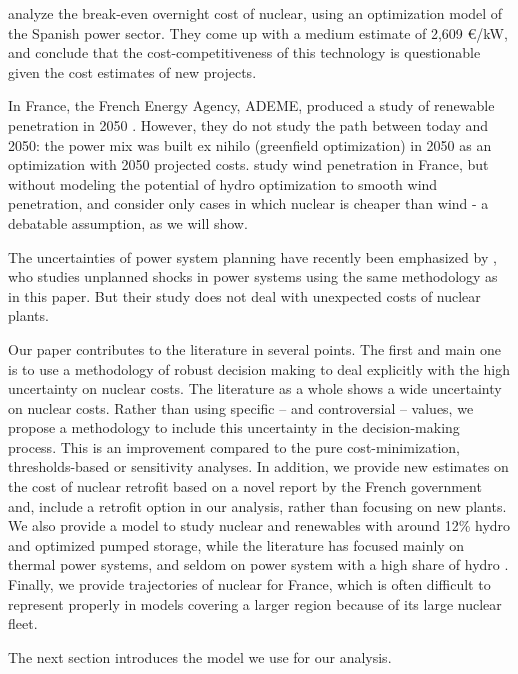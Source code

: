 \citet{Linares2013} analyze the break-even overnight cost of nuclear, using an optimization model of the Spanish power sector. They come up with a medium estimate of 2,609 \euro/kW, and conclude that the cost-competitiveness of this technology is questionable given the cost estimates of new projects.

In France, the French Energy Agency, ADEME, produced a study of renewable penetration in 2050 \citep{ADEME2015}. However, they do not study the path between today and 2050: the power mix was built ex nihilo (greenfield optimization) in 2050 as an optimization with 2050 projected costs.
\citet{Petitet2016} study wind penetration in France, but without modeling the potential of hydro optimization to smooth wind penetration, and consider only cases in which nuclear is cheaper than wind - a debatable assumption, as we will show.

The uncertainties of power system planning have recently been emphasized by \citet{Nahmmacher2016}, who studies unplanned shocks in power systems using the same methodology as in this paper. But their study does not deal with unexpected costs of nuclear plants.

Our paper contributes to the literature in several points. The first and main one is to use a methodology of robust decision making to deal explicitly with the high uncertainty on nuclear costs. The literature as a whole shows a wide uncertainty on nuclear costs. Rather than using specific -- and controversial -- values, we propose a methodology to include this uncertainty in the decision-making process. This is an improvement compared to the pure cost-minimization, thresholds-based or sensitivity analyses. In addition, we provide new estimates on the cost of nuclear retrofit based on a novel report by the French government and, include a retrofit option in our analysis, rather than focusing on new plants. We also provide a model to study nuclear and renewables with around 12\% hydro and optimized pumped storage, while the literature has focused mainly on thermal power systems, and seldom on power system with a high share of hydro \citep{Hirth2016a, Linares2013}. Finally, we provide trajectories of nuclear for France, which is often difficult to represent properly in models covering a larger region because of its large nuclear fleet.



The next section introduces the model we use for our analysis.



